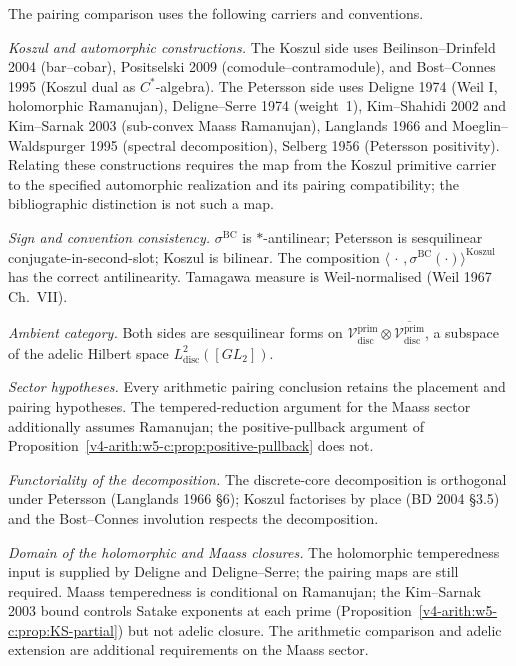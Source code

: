 \begin{remark}
\label{v4-arith:w5-c:rem:source-disjointness-comparison}
The pairing comparison uses the following carriers and conventions.

\textit{Koszul and automorphic constructions.} The Koszul side uses
Beilinson--Drinfeld 2004 (bar--cobar), Positselski 2009
(comodule--contramodule), and Bost--Connes 1995 (Koszul dual as
\(C^{*}\)-algebra). The Petersson side uses Deligne 1974 (Weil
I, holomorphic Ramanujan), Deligne--Serre 1974 (weight~1),
Kim--Shahidi 2002 and Kim--Sarnak 2003 (sub-convex Maass Ramanujan),
Langlands 1966 and Moeglin--Waldspurger 1995 (spectral decomposition),
Selberg 1956 (Petersson positivity). Relating these constructions
requires the map from the Koszul primitive carrier to the specified
automorphic realization and its pairing compatibility; the
bibliographic distinction is not such a map.

\textit{Sign and convention consistency.} \(\sigma^{\mathrm{BC}}\) is
\(*\)-antilinear; Petersson is sesquilinear conjugate-in-second-slot;
Koszul is bilinear. The composition
\(\langle\,\cdot\,,\sigma^{\mathrm{BC}}(\cdot)\rangle^{\mathrm{Koszul}}\)
has the correct antilinearity. Tamagawa measure is Weil-normalised
(Weil 1967 Ch.~VII).

\textit{Ambient category.} Both sides are sesquilinear forms on
\(\mathcal{V}^{\mathrm{prim}}_{\mathrm{disc}}\otimes\overline{\mathcal{V}^{\mathrm{prim}}_{\mathrm{disc}}}\),
a subspace of the adelic Hilbert space \(L^{2}_{\mathrm{disc}}([GL_{2}])\).

\textit{Sector hypotheses.} Every arithmetic pairing conclusion retains the placement and
pairing hypotheses. The tempered-reduction argument for the Maass
sector additionally assumes Ramanujan; the positive-pullback argument
of Proposition~\ref{v4-arith:w5-c:prop:positive-pullback} does not.

\textit{Functoriality of the decomposition.} The discrete-core
decomposition is orthogonal under Petersson (Langlands 1966 \S6);
Koszul factorises by place (BD 2004 \S3.5) and the Bost--Connes
involution respects the decomposition.

\textit{Domain of the holomorphic and Maass closures.} The holomorphic
temperedness input is supplied by Deligne and Deligne--Serre; the
pairing maps are still required. Maass temperedness is conditional
on Ramanujan;
the Kim--Sarnak 2003 bound controls Satake exponents at each
prime (Proposition~\ref{v4-arith:w5-c:prop:KS-partial}) but not adelic closure.
The arithmetic comparison and adelic extension are additional
requirements on the Maass sector.
\end{remark}

